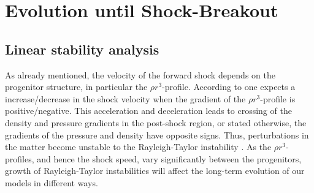 \documentclass[fleqn,usenatbib]{mnras}
\newcommand{\GEO}[1]{{\color{red}#1}}
\begin{document}
\section{Evolution until Shock-Breakout}
\label{sec:Evolution until Shock-Breakout}
\subsection{Linear stability analysis}
\label{sec:Linear stability analysis}
As already mentioned, the velocity of the forward shock depends on the progenitor structure, in particular the $\rho r^3$-profile. According to \cite{Sedov1961} one expects a \GEO{increase/decrease} in the shock velocity when the gradient of the $\rho r^3$-profile is positive/negative. 
\GEO{This acceleration and deceleration leads to crossing of the density and pressure gradients in the post-shock region, or stated otherwise, the gradients of the pressure and density have opposite signs.} Thus, perturbations in the matter become unstable to the Rayleigh-Taylor instability \citep{Rayleigh1882,Chevalier1978}. As the $\rho r^3 $-profiles, and hence the shock speed, vary significantly between the progenitors, growth of Rayleigh-Taylor instabilities will affect the long-term evolution of our models in different ways.
\end{document}

